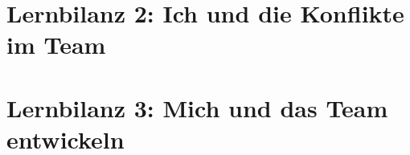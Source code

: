 \documentclass[11pt,twoside]{hsrthesis}
\begin{document}
\chapter{Lernbilanz 2: Ich und die Konflikte im Team}

\chapter{Lernbilanz 3: Mich und das Team entwickeln} 


\printglossary[style=altlist,title=Glossar]





 
\end{document}
